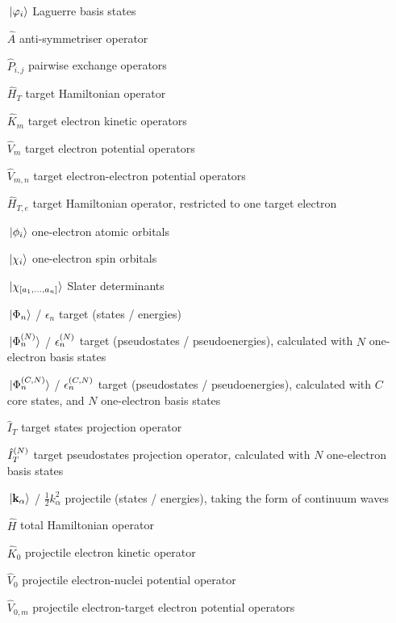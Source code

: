 \documentclass[]{article}
\begin{document}
\begin{itemize}
\item[$\ket*{\varphi_{i}}$]
  Laguerre basis states

\item[$\hat{A}$]
  anti-symmetriser operator
\item[$\hat{P}_{i, j}$]
  pairwise exchange operators

\item[$\hat{H}_{T}$]
  target Hamiltonian operator
\item[$\hat{K}_{m}$]
  target electron kinetic operators
\item[$\hat{V}_{m}$]
  target electron potential operators
\item[$\hat{V}_{m, n}$]
  target electron-electron potential operators
\item[$\hat{H}_{T, e}$]
  target Hamiltonian operator, restricted to one target electron

\item[$\ket*{\phi_{i}}$]
  one-electron atomic orbitals
\item[$\ket*{\chi_{i}}$]
  one-electron spin orbitals
\item[$\ket*{\chi_{[a_{1}, \dotsc, a_{n}]}}$]
  Slater determinants

\item[$\ket*{\Phi_{n}}$ / $\epsilon_{n}$]
  target (states / energies)
\item[$\ket*{\Phi_{n}^{(N)}}$ / $\epsilon_{n}^{(N)}$]
  target (pseudostates / pseudoenergies), calculated with $N$ one-electron basis
  states
\item[$\ket*{\Phi_{n}^{(C, N)}}$ / $\epsilon_{n}^{(C, N)}$]
  target (pseudostates / pseudoenergies), calculated with $C$ core states, and
  $N$ one-electron basis states

\item[$\hat{I}_{T}$]
  target states projection operator
\item[$\hat{I}_{T}^{(N)}$]
  target pseudostates projection operator, calculated with $N$ one-electron
  basis states

\item[$\ket*{\vb{k}_{\alpha}}$ / $\tfrac{1}{2}k_{\alpha}^{2}$]
  projectile (states / energies), taking the form of continuum waves

\item[$\hat{H}$]
  total Hamiltonian operator
\item[$\hat{K}_{0}$]
  projectile electron kinetic operator
\item[$\hat{V}_{0}$]
  projectile electron-nuclei potential operator
\item[$\hat{V}_{0, m}$]
  projectile electron-target electron potential operators


\end{itemize}
\end{document}
